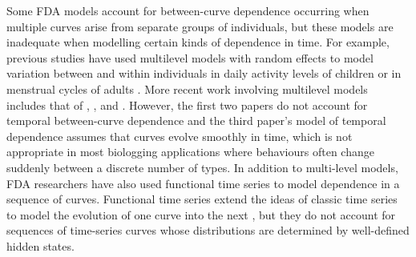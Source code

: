
Some FDA models account for between-curve dependence occurring when multiple curves arise from separate groups of individuals, but these models are inadequate when modelling certain kinds of dependence in time. For example, previous studies have used multilevel models with random effects to model variation between and within individuals in daily activity levels of children \citep{Morris:2007} or in menstrual cycles of adults \citep{Bromback:1998}. More recent work involving multilevel models includes that of \citet{Di:2009}, \citet{Crainiceanu:2009}, and \citet{Chen:2012}. %
However, the first two papers do not account for temporal between-curve dependence and the third paper's model of temporal dependence assumes that curves evolve smoothly in time, which is not appropriate in most biologging applications where behaviours often change suddenly between a discrete number of types.
In addition to multi-level models, FDA researchers have also used functional time series to model dependence in a sequence of curves. Functional time series extend the ideas of classic time series to model the evolution of one curve into the next \citep{Kokoszka:2018}, but they do not account for sequences of time-series curves whose distributions are determined by well-defined hidden states.

